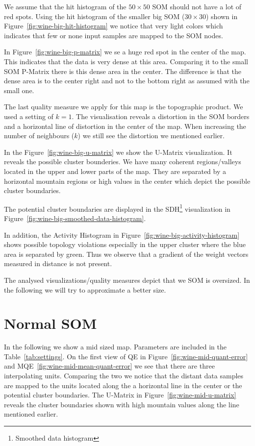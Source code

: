 \documentclass{acm_proc_article-sp}
\begin{document}
We assume that the hit histogram of the $50\times50$ SOM should not have a lot of red spots.
Using the hit histogram of the smaller big SOM ($30\times30$) shown in Figure~\ref{fig:wine-big-hit-histogram} we notice that very light
colors which indicates that few or none input samples are mapped to the SOM nodes.

In Figure~\ref{fig:wine-big-p-matrix} we se a huge red spot in the center of the map. This indicates that
the data is very dense at this area. Comparing it to the small SOM P-Matrix there is this dense area
in the center. The difference is that the dense area is to the center right and not to the bottom right as assumed with
the small one.

The last quality measure we apply for this map is the topographic product.
We used a setting of $k=1$. The visualisation reveals a distortion in the
SOM borders and a horizontal line of distortion in the center of the map.
When increasing the number of neighbours ($k$) we still see the distortion
we mentioned earlier.

In the Figure~\ref{fig:wine-big-u-matrix} we show the U-Matrix visualization.
It reveals the possible cluster bounderies. We have many coherent regions/valleys located in
the upper and lower parts of the map. They are separated by a horizontal mountain regions
or high values in the center which depict the possible cluster boundaries.

The potential cluster boundaries are displayed in the SDH\footnote{Smoothed data histogram} visualization in Figure~\ref{fig:wine-big-smoothed-data-histogram}.

In addition, the Activity Histogram in Figure~\ref{fig:wine-big-activity-histogram} shows possible
topology violations especially in the upper cluster where the blue area is separated by green.
Thus we observe that a gradient of the weight vectors measured in distance is not present. 

The analysed visualizations/quality measures depict that we SOM is oversized.
In the following we will try to approximate a better size.

\section{Normal SOM}

In the following we show a mid sized map. Parameters are included in the Table~\ref{tab:settings}.
On the first view of QE in Figure~\ref{fig:wine-mid-quant-error} and MQE~\ref{fig:wine-mid-mean-quant-error} we see
that there are three interpolating units. Comparing the two we notice that the distant data samples are
mapped to the units located along the a horizontal line in the center or the potential cluster boundaries.
The U-Matrix in Figure~\ref{fig:wine-mid-u-matrix} reveals the cluster boundaries shown with high mountain values
along the line mentioned earlier.
\end{document}
